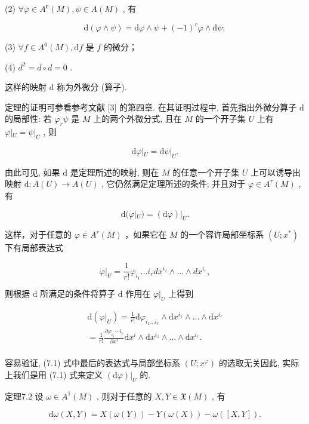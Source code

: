 (2)  $\forall \varphi \in A^{\mathbf{r}}(M), \psi \in A(M)$ , 有

$$
\mathrm {d} (\varphi \wedge \psi) = \mathrm {d} \varphi \wedge \psi + (- 1) ^ {r} \varphi \wedge \mathrm {d} \psi ;
$$

(3)  $\forall f\in A^0 (M),\mathrm{d}f$  是  $f$  的微分；

(4)  $d^2 = d \circ d = 0$ .

这样的映射  $\mathrm{d}$  称为外微分 (算子).

定理的证明可参看参考文献 [3] 的第四章. 在其证明过程中, 首先指出外微分算子  $\mathrm{d}$  的局部性: 若  $\varphi_r \psi$  是  $M$  上的两个外微分式, 且在  $M$  的一个开子集  $U$  上有  $\varphi|_U = \psi|_U$ , 则

$$
\mathrm {d} \varphi | _ {U} = \mathrm {d} \psi | _ {U}.
$$

由此可见, 如果  $\mathrm{d}$  是定理所述的映射, 则在  $M$  的任意一个开子集  $U$  上可以诱导出映射  $\mathrm{d}: A(U) \to A(U)$ , 它仍然满足定理所述的条件; 并且对于  $\varphi \in A^{\tau}(M)$ , 有

$$
\mathrm {d} (\varphi | _ {U}) = (\mathrm {d} \varphi) | _ {U}.
$$

这样，对于任意的  $\varphi \in A^r (M)$  ，如果它在  $M$  的一个容许局部坐标系 $(U;x^{*})$  下有局部表达式

$$
\varphi | _ {U} = \frac {1}{r !} \varphi_ {i _ {1}} \dots i _ {r} d x ^ {i _ {2}} \wedge \dots \wedge d x ^ {i _ {r}},
$$

则根据  $\mathrm{d}$  所满足的条件将算子  $\mathrm{d}$  作用在  $\varphi|_{U}$  上得到

$$
\begin{array}{l} \mathrm {d} (\varphi | _ {U}) = \frac {1}{r !} \mathrm {d} \varphi_ {i _ {1} \dots i _ {r}} \wedge \mathrm {d} x ^ {i _ {1}} \wedge \dots \wedge \mathrm {d} x ^ {i _ {r}} \\ = \frac {1}{r !} \frac {\partial \varphi_ {i _ {1}} \cdots i _ {r}}{\partial x ^ {i}} \mathrm {d} x ^ {i} \wedge \mathrm {d} x ^ {i _ {1}} \wedge \dots \wedge \mathrm {d} x ^ {i _ {r}}. %
\\ \end{array}
$$

容易验证, (7.1) 式中最后的表达式与局部坐标系  $(U; x^{\varphi})$  的选取无关因此, 实际上我们是用 (7.1) 式来定义  $(\mathrm{d}\varphi)|_{U}$  的.

定理7.2 设  $\omega \in A^{1}(M)$ , 则对于任意的  $X, Y \in \mathfrak{X}(M)$ , 有

$$
\mathrm {d} \omega (X, Y) = X (\omega (Y)) - Y (\omega (X)) - \omega ([ X, Y ]).
$$

